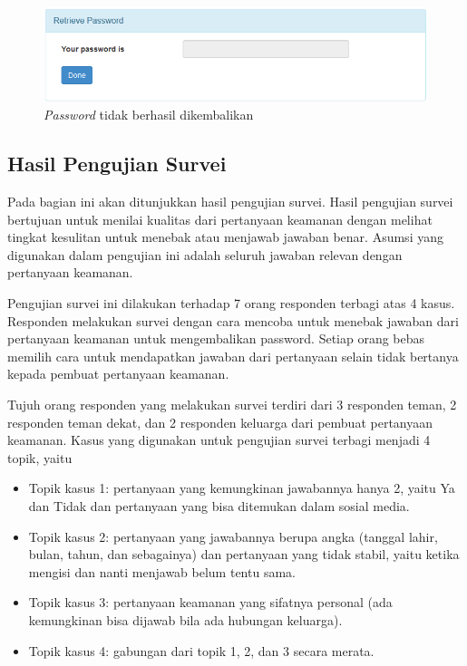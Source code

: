 \begin{figure}[H]
	\includegraphics[scale=0.5]{Gambar/balik_password_gagal_next}
	\centering
	\caption{\textit{Password} tidak berhasil dikembalikan}\label{fig:balik_password_gagal_next}
\end{figure}

\subsection{Hasil Pengujian Survei}\label{subsec:hasil_pengujian_survei}

Pada bagian ini akan ditunjukkan hasil pengujian survei. Hasil pengujian survei bertujuan untuk menilai kualitas dari pertanyaan keamanan dengan melihat tingkat kesulitan untuk menebak atau menjawab jawaban benar. Asumsi yang digunakan dalam pengujian ini adalah seluruh jawaban relevan dengan pertanyaan keamanan.

Pengujian survei ini dilakukan terhadap 7 orang responden terbagi atas 4 kasus. Responden melakukan survei dengan cara mencoba untuk menebak jawaban dari pertanyaan keamanan untuk mengembalikan password. Setiap orang bebas memilih cara untuk mendapatkan jawaban dari pertanyaan selain tidak bertanya kepada pembuat pertanyaan keamanan. 

Tujuh orang responden yang melakukan survei terdiri dari 3 responden teman, 2 responden teman dekat, dan 2 responden keluarga dari pembuat pertanyaan keamanan. Kasus yang digunakan untuk pengujian survei terbagi menjadi 4 topik, yaitu
\begin{itemize}
	\item Topik kasus 1: pertanyaan yang kemungkinan jawabannya hanya 2, yaitu Ya dan Tidak dan pertanyaan yang bisa ditemukan dalam sosial media.
	\item Topik kasus 2: pertanyaan yang jawabannya berupa angka (tanggal lahir, bulan, tahun, dan sebagainya) dan pertanyaan yang tidak stabil, yaitu ketika mengisi dan nanti menjawab belum tentu sama.
	\item Topik kasus 3: pertanyaan keamanan yang sifatnya personal (ada kemungkinan bisa dijawab bila ada hubungan keluarga).
	\item Topik kasus 4: gabungan dari topik 1, 2, dan 3 secara merata.
\end{itemize}

